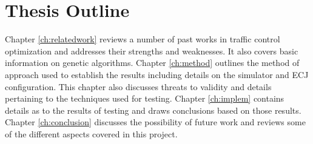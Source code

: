\section{Thesis Outline}\label{sec:outline}
Chapter \ref{ch:relatedwork} reviews a number of past works in traffic control optimization and addresses their strengths and weaknesses.  It also covers basic information on genetic algorithms.  Chapter \ref{ch:method} outlines the method of approach used to establish the
results including details on the simulator and ECJ configuration.  This chapter also discusses threats to validity and details pertaining to the techniques used for testing.  Chapter \ref{ch:implem} contains details as to the results of testing and draws conclusions based on those results.  Chapter \ref{ch:conclusion} discusses the possibility of future work and reviews some of the different aspects covered in this project.